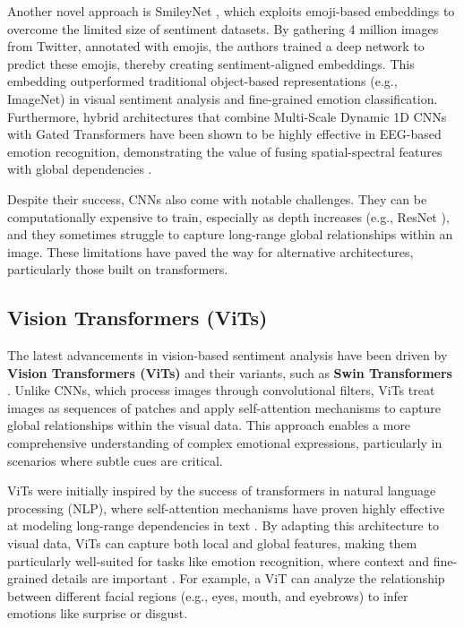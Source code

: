 Another novel approach is SmileyNet \cite{al-halah2020}, which exploits emoji-based embeddings to overcome the limited size of sentiment datasets. By gathering 4 million images from Twitter, annotated with emojis, the authors trained a deep network to predict these emojis, thereby creating sentiment-aligned embeddings. This embedding outperformed traditional object-based representations (e.g., ImageNet) in visual sentiment analysis and fine-grained emotion classification. Furthermore, hybrid architectures that combine Multi-Scale Dynamic 1D CNNs with Gated Transformers have been shown to be highly effective in EEG-based emotion recognition, demonstrating the value of fusing spatial-spectral features with global dependencies \cite{cheng_eeg-based_2024}.
\newline

Despite their success, CNNs also come with notable challenges. They can be computationally expensive to train, especially as depth increases (e.g., ResNet \cite{he2015deepresiduallearningimage}), and they sometimes struggle to capture long-range global relationships within an image. These limitations have paved the way for alternative architectures, particularly those built on transformers.

\subsection*{Vision Transformers (ViTs)}

The latest advancements in vision-based sentiment analysis have been driven by \textbf{Vision Transformers (ViTs)} \cite{dosovitskiy2021imageworth16x16words} and their variants, such as \textbf{Swin Transformers} \cite{liu2021swintransformerhierarchicalvision}. Unlike CNNs, which process images through convolutional filters, ViTs treat images as sequences of patches and apply self-attention mechanisms to capture global relationships within the visual data. This approach enables a more comprehensive understanding of complex emotional expressions, particularly in scenarios where subtle cues are critical.
\newline

ViTs were initially inspired by the success of transformers in natural language processing (NLP), where self-attention mechanisms have proven highly effective at modeling long-range dependencies in text \cite{vaswani2023attentionneed}. By adapting this architecture to visual data, ViTs can capture both local and global features, making them particularly well-suited for tasks like emotion recognition, where context and fine-grained details are important \cite{dosovitskiy2021imageworth16x16words}. For example, a ViT can analyze the relationship between different facial regions (e.g., eyes, mouth, and eyebrows) to infer emotions like surprise or disgust.
\newline

